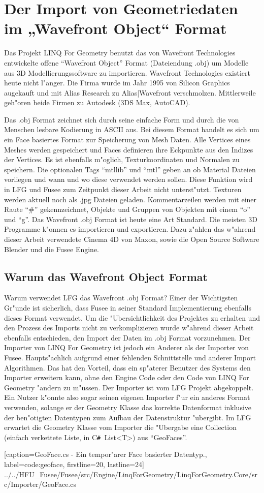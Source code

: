 \documentclass[pagesize, paper=a4, fontsize=12pt,titlepage=true, headings=small, headnosepline, abstractoff, liststotoc, nochapterprefix, plainheadsepline]{scrreprt}
\newcommand{\CSS}{C\texttt{\# }}
\newcommand{\LFGS}{LINQ For Geometry }
\begin{document}
	\section {Der Import von Geometriedaten im „Wavefront Object“ Format}
		Das Projekt \LFGS benutzt das von Wavefront Technologies entwickelte offene "`Wavefront Object"' Format (Dateiendung .obj) um Modelle aus 3D Modellierungssoftware zu importieren. Wavefront Technologies existiert heute nicht l"anger. Die Firma wurde im Jahr 1995 von Silicon Graphics augekauft und mit Alias Research zu Alias|Wavefront verschmolzen. Mittlerweile geh"oren beide Firmen zu Autodesk (3DS Max, AutoCAD).

Das .obj Format zeichnet sich durch seine einfache Form und durch die von Menschen lesbare Kodierung in ASCII aus. Bei diesem Format handelt es sich um ein Face basiertes Format zur Speicherung von Mesh Daten. Alle Vertices eines Meshes werden gespeichert und Faces definieren ihre Eckpunkte aus den Indizes der Vertices. Es ist ebenfalls m"oglich, Texturkoordinaten und Normalen zu speichern. Die optionalen Tags "`mtllib"' und "`mtl"' geben an ob Material Dateien vorliegen und wann und wo diese verwendet werden sollen. Diese Funktion wird in LFG und Fusee zum Zeitpunkt dieser Arbeit nicht unterst"utzt. Texturen werden aktuell noch als .jpg Dateien geladen. Kommentarzeilen werden mit einer Raute "`\#"' gekennzeichnet, Objekte und Gruppen von Objekten mit einem "`o"' und "`g"'. Das Wavefront .obj Format ist heute eine Art Standard. Die meisten 3D Programme k"onnen es importieren und exportieren. Dazu z"ahlen das w"ahrend dieser Arbeit verwendete Cinema 4D von Maxon, sowie die Open Source Software Blender und die Fusee Engine.
		\subsection {Warum das Wavefront Object Format}
			Warum verwendet LFG das Wavefront .obj Format? Einer der Wichtigsten Gr"unde ist sicherlich, dass Fusee in seiner Standard Implementierung ebenfalls dieses Format verwendet. Um die "Ubersichtlichkeit des Projektes zu erhalten und den Prozess des Imports nicht zu verkomplizieren wurde w"ahrend dieser Arbeit ebenfalls entschieden, den Import der Daten im .obj Format vorzunehmen. Der Importer von \LFGS ist jedoch ein Anderer als der Importer von Fusee. Haupts"achlich aufgrund einer fehlenden Schnittstelle und anderer Import Algorithmen. Das hat den Vorteil, dass ein sp"aterer Benutzer des Systems den Importer erweitern kann, ohne den Engine Code oder den Code von \LFGS "andern zu m"ussen. Der Importer ist vom LFG Projekt abgekoppelt. Ein Nutzer k"onnte also sogar seinen eigenen Importer f"ur ein anderes Format verwenden, solange er der Geometry Klasse das korrekte Datenformat inklusive der ben"otigten Datentypen zum Aufbau der Datenstruktur "ubergibt. Im LFG erwartet die Geometry Klasse vom Importer die "Ubergabe eine Collection (einfach verkettete Liste, in \CSS List<T>) aus "`GeoFaces"'.

			[caption={GeoFace.cs - Ein tempor"arer Face basierter Datentyp.}, label=code:geoface, firstline=20, lastline=24]
			{../../HFU_Fusee/Fusee/src/Engine/LinqForGeometry/LinqForGeometry.Core/src/Importer/GeoFace.cs}
\end{document}
